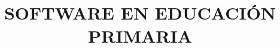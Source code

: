 \documentclass[12pt]{report}
\begin{document}









\title{\Huge SOFTWARE EN EDUCACIÓN PRIMARIA} %
\end{document}
